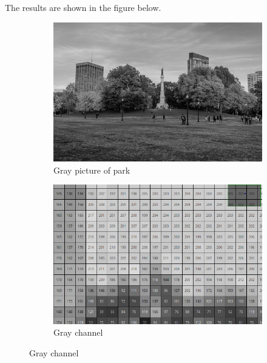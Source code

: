 \documentclass{article}
\begin{document}
      The results are shown in the figure below.

      \begin{figure}[H]
        \centering
        \begin{subfigure}[b]{0.45\textwidth}
        \centering
            \includegraphics[width=\textwidth]{img/OpenCV/Gray_Full.png}
            \caption{Gray picture of park}
            \label{fig:1d}
        \end{subfigure}
        \begin{subfigure}[b]{0.45\textwidth}
        \centering
            \includegraphics[width=\textwidth]{img/OpenCV/Gray_Cropped.png}
            \caption{Gray channel}
            \label{fig:2d}
        \end{subfigure}


\end{figure}
\end{document}
